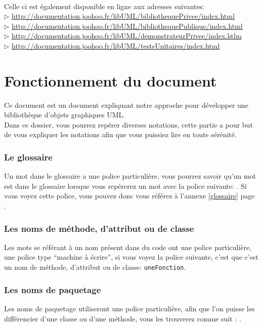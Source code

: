 	\paragraph{}
	Celle ci est également disponible en ligne aux adresses suivantes: \\
	$\rhd$ \url{http://documentation.joohoo.fr/libUML/bibliothequePrivee/index.html}\\
	$\rhd$ \url{http://documentation.joohoo.fr/libUML/bibliothequePublique/index.html}\\
	$\rhd$ \url{http://documentation.joohoo.fr/libUML/demonstrateurPrivee/index.htlm}\\
	$\rhd$ \url{http://documentation.joohoo.fr/libUML/testsUnitaires/index.html}\\
	\newpage
\section*{Fonctionnement du document}
Ce document est un document expliquant notre approche pour développer une bibliothèque d'objets graphiques UML.\\

Dans ce dossier, vous pourrez repérer diverses notations, cette partie a pour but de vous expliquer les notations afin
que vous puissiez lire en toute sérénité.
\subsubsection*{Le glossaire}
Un mot dans le glossaire a une police particulière, vous pourrez savoir qu'un mot est dans le glossaire lorsque vous repérerez un mot avec la police suivante: 
. Si vous voyez cette police, vous pouvez donc vous référez à l'annexe \ref{glossaire} page \pageref{glossaire}.
\subsubsection*{Les noms de méthode, d'attribut ou de classe}
Les mots se référant à un nom présent dans du code ont une police particulière, une police type ``machine à écrire'', si vous voyez la police suivante, c'est que c'est un nom 
de méthode, d'attribut ou de classe: \texttt{uneFonction}.
\subsubsection*{Les noms de paquetage}
Les noms de paquetage utiliseront une police particulière, afin que l'on puisse les différencier d'une classe ou d'une méthode, vous les trouverez 
comme suit : .
